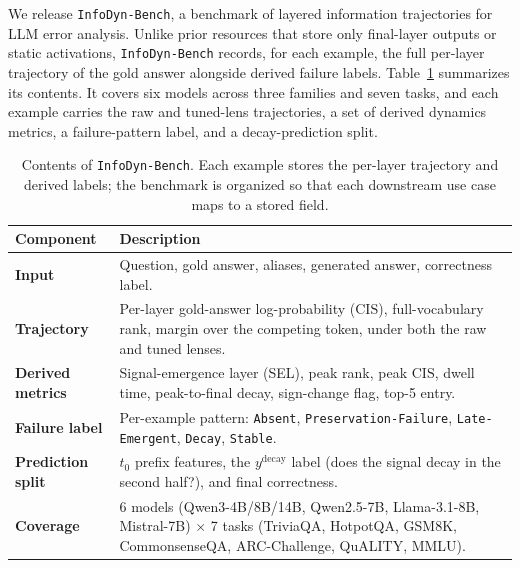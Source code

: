 \documentclass{article} %
\begin{document}
We release \texttt{InfoDyn-Bench}, a benchmark of layered information trajectories for LLM error analysis. Unlike prior resources that store only final-layer outputs or static activations, \texttt{InfoDyn-Bench} records, for each example, the full per-layer trajectory of the gold answer alongside derived failure labels. Table~\ref{tab:benchmark} summarizes its contents. It covers six models across three families and seven tasks, and each example carries the raw and tuned-lens trajectories, a set of derived dynamics metrics, a failure-pattern label, and a decay-prediction split.

\begin{table}[t]
\centering
\caption{Contents of \texttt{InfoDyn-Bench}. Each example stores the per-layer trajectory and derived labels; the benchmark is organized so that each downstream use case maps to a stored field.}
\label{tab:benchmark}
\small
\begin{tabular}{lp{8.6cm}}
\toprule
\textbf{Component} & \textbf{Description} \\
\midrule
\textbf{Input} & Question, gold answer, aliases, generated answer, correctness label. \\
\textbf{Trajectory} & Per-layer gold-answer log-probability ($\mathrm{CIS}$), full-vocabulary rank, margin over the competing token, under both the raw and tuned lenses. \\
\textbf{Derived metrics} & Signal-emergence layer (SEL), peak rank, peak $\mathrm{CIS}$, dwell time, peak-to-final decay, sign-change flag, top-5 entry. \\
\textbf{Failure label} & Per-example pattern: \texttt{Absent}, \texttt{Preservation-Failure}, \texttt{Late-Emergent}, \texttt{Decay}, \texttt{Stable}. \\
\textbf{Prediction split} & $t_0$ prefix features, the $y^{\mathrm{decay}}$ label (does the signal decay in the second half?), and final correctness. \\
\textbf{Coverage} & 6 models (Qwen3-4B/8B/14B, Qwen2.5-7B, Llama-3.1-8B, Mistral-7B) $\times$ 7 tasks (TriviaQA, HotpotQA, GSM8K, CommonsenseQA, ARC-Challenge, QuALITY, MMLU). \\
\bottomrule
\end{tabular}
\end{table}
\end{document}
